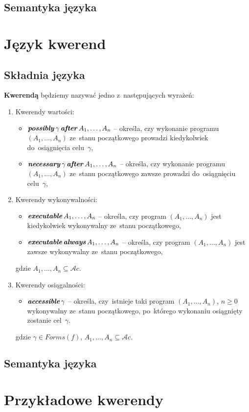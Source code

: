 \documentclass[11pt,a4paper]{article}
\DeclareMathOperator{\After}{\textbf{\textit{after}}}
\DeclareMathOperator{\Always}{\textbf{\textit{always}}}
\DeclareMathOperator{\Executable}{\textbf{\textit{executable}}}
\DeclareMathOperator{\Accessible}{\textbf{\textit{accessible}}}
\DeclareMathOperator{\Possibly}{\textbf{\textit{possibly}}}
\DeclareMathOperator{\Necessary}{\textbf{\textit{necessary}}}
\begin{document}
\subsection{Semantyka języka}

\section{Język kwerend}

\subsection{Składnia języka}

    \textbf{Kwerendą} będziemy nazywać jedno z~następujących wyrażeń:

    \begin{enumerate}
        \item Kwerendy wartości:
        \begin{itemize}            
            \item $\Possibly \gamma \After A_1, \dots, A_n$ -- określa, czy wykonanie programu $(A_1, \dots, A_n)$ ze~stanu początkowego prowadzi kiedykolwiek do~osiągnięcia celu~$\gamma$,
            \item $\Necessary \gamma \After A_1, \dots, A_n$ -- określa, czy wykonanie programu $(A_1, \dots, A_n)$ ze~stanu początkowego zawsze prowadzi do~osiągnięciu celu~$\gamma$,
        \end{itemize}
        \item Kwerendy wykonywalności:
        \begin{itemize}
            \item $\Executable A_1, \dots, A_n$ -- określa, czy program $(A_1, \dots, A_n)$ jest kiedykolwiek wykonywalny ze~stanu początkowego,
            \item $\Executable \Always A_1, \dots, A_n$ -- określa, czy program $(A_1, \dots, A_n)$ jest zawsze wykonywalny ze~stanu początkowego,
        \end{itemize}
        gdzie $A_1, \dots, A_n \subseteq \mathcal{A}c$.
        \item Kwerendy osiągalności:
        \begin{itemize}
            \item $\Accessible \gamma$ -- określa, czy~istnieje taki program $(A_1, \dots, A_n)$, $n \geq 0$ wykonywalny ze~stanu początkowego, po~którego wykonaniu osiągnięty zostanie cel~$\gamma$.
        \end{itemize}
        gdzie $\gamma \in Forms(f)$, $A_1, \dots, A_n \subseteq \mathcal{A}c$.
    \end{enumerate}


\subsection{Semantyka języka}

\section{Przykładowe kwerendy}
\end{document}
